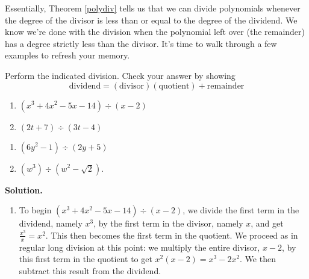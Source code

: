\medskip

Essentially, Theorem \ref{polydiv} tells us that we can divide polynomials whenever the degree of the divisor is less than or equal to the degree of the dividend.  We know we're done with the division when the polynomial left over (the remainder) has a degree strictly less than the divisor.  It's time to walk through a few examples to refresh your memory.

\begin{ex}\label{polynomiallongdivex}  Perform the indicated division.  Check your answer by showing \[\text{dividend} = (\text{divisor})( \text{quotient}) + \text{remainder}\]

\begin{multicols}{2}

\begin{enumerate}

\item  $\left(x^3 + 4x^2 - 5x - 14\right) \div (x-2)$

\item  $\left(2t +  7\right) \div \left(3t - 4\right)$

\setcounter{HW}{\value{enumi}}

\end{enumerate}

\end{multicols}

\begin{multicols}{2}

\begin{enumerate}

\setcounter{enumi}{\value{HW}}



\item  $\left(6y^2 - 1 \right) \div \left(2y + 5\right)$

\item  $\left(w^3 \right) \div \left(w^2 - \sqrt{2}\right)$.

\setcounter{HW}{\value{enumi}}

\end{enumerate}

\end{multicols}


{\bf Solution.}

\begin{enumerate}

\item  To begin $\left(x^3 + 4x^2 - 5x - 14\right) \div (x-2)$, we divide the first term in the dividend, namely $x^3$, by the first term in the divisor, namely $x$, and get $\frac{x^3}{x} = x^2$. This then becomes the first term in the quotient.  We proceed as in regular long division at this point: we multiply the entire divisor, $x-2$, by this first term in the quotient to get $x^{2}(x - 2) = x^3 - 2x^2$.  We then subtract this result from the dividend.\setlength\arraycolsep{0.1pt}\setlength\extrarowheight{2pt}\[ \begin{array}{cccccccccc}


\end{array}\]
\end{enumerate}
\end{ex}
